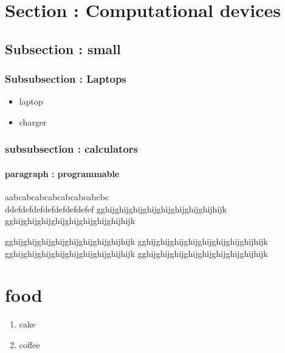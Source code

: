 \documentclass{article}  %
\begin{document}
 
\section{ Section : Computational devices} 
 
\subsection{ Subsection : small}

\subsubsection{ Subsubsection : Laptops}
\begin{itemize}  
\item laptop  
\item charger  
\end{itemize}  
 
\subsubsection{ subsubsection : calculators}
\paragraph{ paragraph : programmable}
 
aabcabcabcabcabcabcabcbc\\   %
ddefdefdefdefdefdefdefef
gghijghijghijghijghijghijghijghijhijk
gghijghijghijghijghijghijghijghijhijk
 
 
 
 
gghijghijghijghijghijghijghijghijhijk
gghijghijghijghijghijghijghijghijhijk
gghijghijghijghijghijghijghijghijhijk
gghijghijghijghijghijghijghijghijhijk
 

\section{food}
\begin{enumerate}  
\item cake  
\item coffee 
\end{enumerate}  
\end{document}
